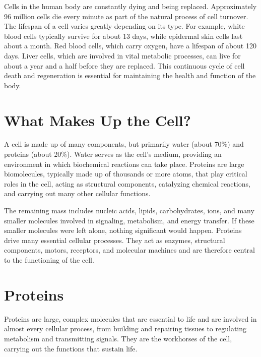 Cells in the human body are constantly dying and being replaced.
Approximately 96 million cells die every minute as part of the natural process of cell turnover. The lifespan of a cell varies greatly depending on its type. For example, white blood cells typically survive for about 13 days, while epidermal skin cells last about a month. Red blood cells, which carry oxygen, have a lifespan of about 120 days. Liver cells, which are involved in vital metabolic processes, can live for about a year and a half before they are replaced. This continuous cycle of cell death and regeneration is essential for maintaining the health and function of the body.


\section{What Makes Up the Cell?}

A cell is made up of many components, but primarily water (about 70\%) and proteins (about 20\%). Water serves as the cell's medium, providing an environment in which biochemical reactions can take place. Proteins are large biomolecules, typically made up of thousands or more atoms, that play critical roles in the cell, acting as structural components, catalyzing chemical reactions, and carrying out many other cellular functions.

The remaining mass includes nucleic acids, lipids, carbohydrates, ions, and many smaller molecules involved in signaling, metabolism, and energy transfer. If these smaller molecules were left alone, nothing significant would happen. Proteins drive many essential cellular processes. They act as enzymes, structural components, motors, receptors, and molecular machines and are therefore central to the functioning of the cell.

\section{Proteins}

Proteins are large, complex molecules that are essential to life and are involved in almost every cellular process, from building and repairing tissues to regulating metabolism and transmitting signals. They are the workhorses of the cell, carrying out the functions that sustain life.

